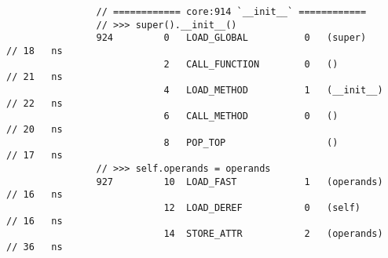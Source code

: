 \begin{code}
\begin{verbatim}
                // ============ core:914 `__init__` ============
                // >>> super().__init__()
                924         0   LOAD_GLOBAL          0   (super)                                    // 18   ns
                            2   CALL_FUNCTION        0   ()                                         // 21   ns
                            4   LOAD_METHOD          1   (__init__)                                 // 22   ns
                            6   CALL_METHOD          0   ()                                         // 20   ns
                            8   POP_TOP                  ()                                         // 17   ns
                // >>> self.operands = operands
                927         10  LOAD_FAST            1   (operands)                                 // 16   ns
                            12  LOAD_DEREF           0   (self)                                     // 16   ns
                            14  STORE_ATTR           2   (operands)                                 // 36   ns


\end{verbatim}
\end{code}
